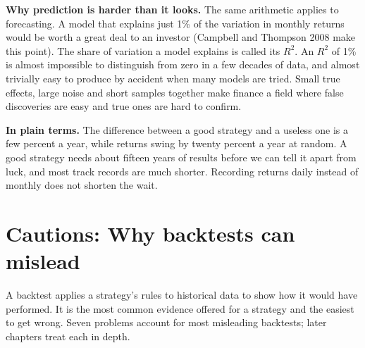
\textbf{Why prediction is harder than it looks.} The same arithmetic applies to forecasting. A model that explains just 1\% of the variation in monthly returns would be worth a great deal to an investor (Campbell and Thompson 2008 make this point). The share of variation a model explains is called its $R^2$. An $R^2$ of 1\% is almost impossible to distinguish from zero in a few decades of data, and almost trivially easy to produce by accident when many models are tried. Small true effects, large noise and short samples together make finance a field where false discoveries are easy and true ones are hard to confirm.

\noindent\textbf{In plain terms.} The difference between a good strategy and a useless one is a few percent a year, while returns swing by twenty percent a year at random. A good strategy needs about fifteen years of results before we can tell it apart from luck, and most track records are much shorter. Recording returns daily instead of monthly does not shorten the wait.

\section{Cautions: Why backtests can mislead}
\label{sec:01-backtests}

A backtest applies a strategy's rules to historical data to show how it would have performed. It is the most common evidence offered for a strategy and the easiest to get wrong. Seven problems account for most misleading backtests; later chapters treat each in depth.

